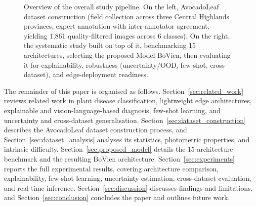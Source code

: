 \begin{figure}[t]
{%
}
\caption{Overview of the overall study pipeline. On the left, AvocadoLeaf dataset construction (field collection across three Central Highlands provinces, expert annotation with inter-annotator agreement, yielding 1{,}861 quality-filtered images across 6 classes). On the right, the systematic study built on top of it, benchmarking 15 architectures, selecting the proposed Model BoVien, then evaluating it for explainability, robustness (uncertainty/OOD, few-shot, cross-dataset), and edge-deployment readiness.}
\label{fig:pipeline_overview}
\end{figure}

The remainder of this paper is organised as follows. Section~\ref{sec:related_work} reviews related work in plant disease classification, lightweight edge architectures, explainable and vision-language-based diagnosis, few-shot learning, and uncertainty and cross-dataset generalisation. Section~\ref{sec:dataset_construction} describes the AvocadoLeaf dataset construction process, and Section~\ref{sec:dataset_analysis} analyses its statistics, photometric properties, and intrinsic difficulty. Section~\ref{sec:proposed_model} details the 15-architecture benchmark and the resulting BoVien architecture. Section~\ref{sec:experiments} reports the full experimental results, covering architecture comparison, explainability, few-shot learning, uncertainty estimation, cross-dataset evaluation, and real-time inference. Section~\ref{sec:discussion} discusses findings and limitations, and Section~\ref{sec:conclusion} concludes the paper and outlines future work.